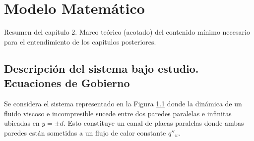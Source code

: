 \chapter{Modelo Matemático} \label{cap:modelo}

Resumen del capítulo 2. Marco teórico (acotado) del contenido mínimo necesario para el entendimiento de los
capitulos posteriores.

\newpage

\section{Descripción del sistema bajo estudio. Ecuaciones de Gobierno}

Se considera el sistema representado en la Figura \ref{fig:sistem_domain} donde la dinámica de un fluido viscoso e incompresible sucede entre dos paredes paralelas e infinitas ubicadas en $y=\pm d$. Esto constituye un canal de placas paralelas donde ambas paredes están sometidas a un flujo de calor constante $q''_w$.

\begin{figure}[H]
 \centering
 \caption{} 
 \label{fig:sistem_domain}
\end{figure}

